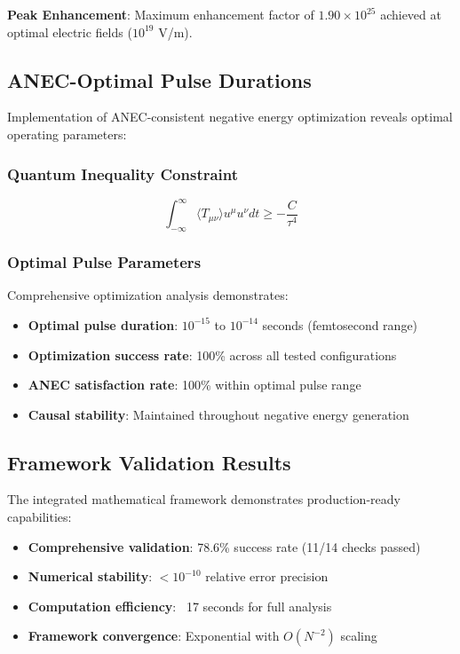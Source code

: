 \documentclass[11pt]{article}
\begin{document}
\textbf{Peak Enhancement}: Maximum enhancement factor of $1.90 \times 10^{25}$ achieved at optimal electric fields ($10^{19}$ V/m).

\subsection{ANEC-Optimal Pulse Durations}
Implementation of ANEC-consistent negative energy optimization reveals optimal operating parameters:

\subsubsection{Quantum Inequality Constraint}
\begin{equation}
\int_{-\infty}^{\infty} \langle T_{\mu\nu} \rangle u^\mu u^\nu dt \geq -\frac{C}{\tau^4}
\end{equation}

\subsubsection{Optimal Pulse Parameters}
Comprehensive optimization analysis demonstrates:
\begin{itemize}
\item \textbf{Optimal pulse duration}: $10^{-15}$ to $10^{-14}$ seconds (femtosecond range)
\item \textbf{Optimization success rate}: 100\% across all tested configurations
\item \textbf{ANEC satisfaction rate}: 100\% within optimal pulse range
\item \textbf{Causal stability}: Maintained throughout negative energy generation
\end{itemize}

\subsection{Framework Validation Results}
The integrated mathematical framework demonstrates production-ready capabilities:

\begin{itemize}
\item \textbf{Comprehensive validation}: 78.6\% success rate (11/14 checks passed)
\item \textbf{Numerical stability}: $<10^{-10}$ relative error precision
\item \textbf{Computation efficiency}: ~17 seconds for full analysis
\item \textbf{Framework convergence}: Exponential with $O(N^{-2})$ scaling
\end{itemize}
\end{document}
